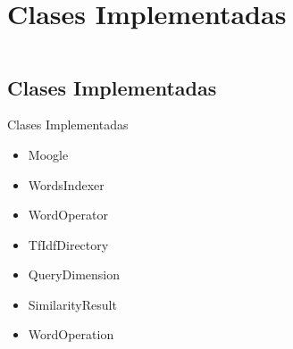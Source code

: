 \section{Clases Implementadas}

\begin{frame}
    \begin{columns}[t]
        \begin{column}{.5\textwidth}
          \tableofcontents[sections={1-2},currentsection]
        \end{column}
        \begin{column}{.5\textwidth}
          \tableofcontents[sections={3-4},currentsection]
        \end{column}
    \end{columns}
\end{frame}

\subsection{Clases Implementadas}
\begin{frame}[fragile]{Clases Implementadas}

\begin{itemize}
	\item Moogle
	\item WordsIndexer
	\item WordOperator
	\item TfIdfDirectory
	\item QueryDimension
	\item SimilarityResult
	\item WordOperation
\end{itemize}
\end{frame}
